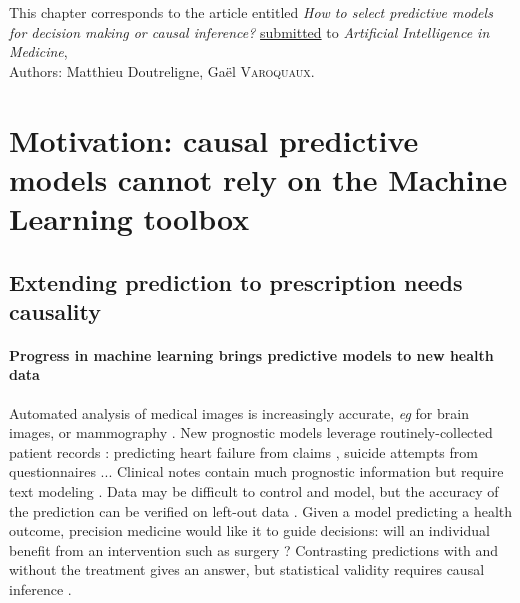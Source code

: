 \documentclass[french,12pt,twoside,a4paper]{book}
\begin{document}
\vfill

\begin{flushright}
  \begin{minipage}{15cm}
    {\small{This chapter corresponds to the article entitled \textit{How to select
          predictive models for decision making or causal inference?}
        \underline{submitted} to \textit{Artificial
          Intelligence in Medicine},}}\\

    {\small\hfill{}Authors: Matthieu Doutreligne, Gaël \textsc{Varoquaux}.}
  \end{minipage}
\end{flushright}

\clearpage
\minitoc

\section{Motivation: causal predictive models cannot rely on the Machine Learning
  toolbox}\label{sec:causal_model_selection:motivation}

\subsection{Extending prediction to prescription needs causality}\label{subsec:causal_model_selection:extending_prediction}

\paragraph{Progress in machine learning brings predictive models to new health
  data} \citep{beam2018big,rajkomar2019machine} Automated analysis of medical
images is increasingly accurate, \emph{eg} for brain images,
\citep{khojaste2022deep,zhang2019radiological} or mammography
\citep{yala2019deep,shen2019deep,nassif2022breast}. New prognostic models
leverage routinely-collected patient records \citep{mooney2018bigdata}:
predicting heart failure from claims \citep{desai2020comparison}, suicide
attempts from questionnaires \citep{simon2018predicting}... Clinical notes
contain much prognostic information but require text modeling
\citep{horng2017creating,wang2020prediction,spasic2020clinical,
  jiang2023health}. Data may be difficult to control and model, but the accuracy
of the prediction can be verified on left-out data
\citep{altman2009prognosis,poldrack2020establishment,varoquaux2022evaluating}.
Given a model predicting a health outcome, precision medicine would like it to
guide decisions: will an individual benefit from an intervention such as
surgery \citep{fontana2019can}? Contrasting predictions with and without the
treatment gives an answer, but statistical validity requires causal inference
\citep{snowden2011implementation,blakely2020reflection}.
\end{document}
